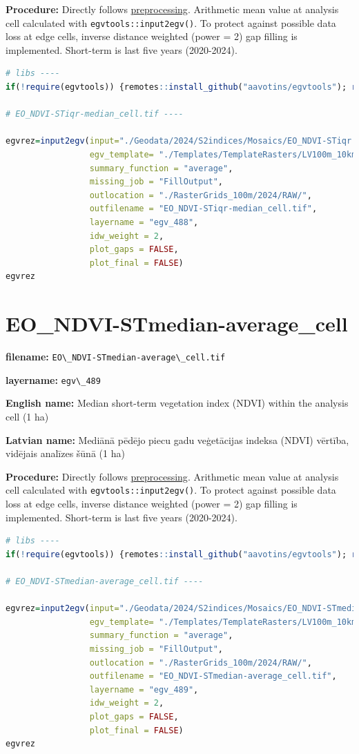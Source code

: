 \documentclass[
]{book}
\newcommand{\passthrough}[1]{#1}
\begin{document}
\textbf{Procedure:} Directly follows \hyperref[Ch04.13]{preprocessing}. Arithmetic mean value at analysis cell
calculated with \passthrough{\lstinline!egvtools::input2egv()!}. To protect against possible data loss at edge cells,
inverse distance weighted (power = 2) gap filling is implemented. Short-term is last five years (2020-2024).

\begin{lstlisting}[language=R]
# libs ----
if(!require(egvtools)) {remotes::install_github("aavotins/egvtools"); require(egvtools)}

# EO_NDVI-STiqr-median_cell.tif ----

egvrez=input2egv(input="./Geodata/2024/S2indices/Mosaics/EO_NDVI-STiqr.tif",
                 egv_template= "./Templates/TemplateRasters/LV100m_10km.tif",
                 summary_function = "average",
                 missing_job = "FillOutput",
                 outlocation = "./RasterGrids_100m/2024/RAW/",
                 outfilename = "EO_NDVI-STiqr-median_cell.tif",
                 layername = "egv_488",
                 idw_weight = 2,
                 plot_gaps = FALSE,
                 plot_final = FALSE)
egvrez
\end{lstlisting}

\section{EO\_NDVI-STmedian-average\_cell}\label{ch06.489}

\textbf{filename:} \passthrough{\lstinline!EO\_NDVI-STmedian-average\_cell.tif!}

\textbf{layername:} \passthrough{\lstinline!egv\_489!}

\textbf{English name:} Median short-term vegetation index (NDVI) within the analysis cell (1 ha)

\textbf{Latvian name:} Mediānā pēdējo piecu gadu veģetācijas indeksa (NDVI) vērtība, vidējais analīzes šūnā (1 ha)

\textbf{Procedure:} Directly follows \hyperref[Ch04.13]{preprocessing}. Arithmetic mean value at analysis cell
calculated with \passthrough{\lstinline!egvtools::input2egv()!}. To protect against possible data loss at edge cells,
inverse distance weighted (power = 2) gap filling is implemented. Short-term is last five years (2020-2024).

\begin{lstlisting}[language=R]
# libs ----
if(!require(egvtools)) {remotes::install_github("aavotins/egvtools"); require(egvtools)}

# EO_NDVI-STmedian-average_cell.tif ----

egvrez=input2egv(input="./Geodata/2024/S2indices/Mosaics/EO_NDVI-STmedian.tif",
                 egv_template= "./Templates/TemplateRasters/LV100m_10km.tif",
                 summary_function = "average",
                 missing_job = "FillOutput",
                 outlocation = "./RasterGrids_100m/2024/RAW/",
                 outfilename = "EO_NDVI-STmedian-average_cell.tif",
                 layername = "egv_489",
                 idw_weight = 2,
                 plot_gaps = FALSE,
                 plot_final = FALSE)
egvrez
\end{lstlisting}
\end{document}
